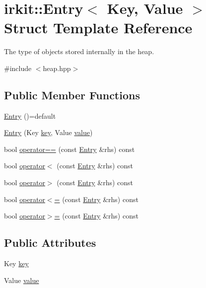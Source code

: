 \hypertarget{structirkit_1_1Entry}{}\section{irkit\+:\+:Entry$<$ Key, Value $>$ Struct Template Reference}
\label{structirkit_1_1Entry}


The type of objects stored internally in the heap.  




{\ttfamily \#include $<$heap.\+hpp$>$}

\subsection*{Public Member Functions}
\begin{DoxyCompactItemize}
\item 
\hyperlink{structirkit_1_1Entry_ab8d6ae4f3f3ff0c1934543f2eca895ea}{Entry} ()=default
\item 
\hyperlink{structirkit_1_1Entry_afe9a7f9975902c4622115176169bc80a}{Entry} (Key \hyperlink{structirkit_1_1Entry_aeae4387483b4905afd7dfd71df9104fc}{key}, Value \hyperlink{structirkit_1_1Entry_a72e5dd8efe13d360f7b97c37d05b99b8}{value})
\item 
bool \hyperlink{structirkit_1_1Entry_aaa12df0ae7e66638a6f0e5ddb552167b}{operator==} (const \hyperlink{structirkit_1_1Entry}{Entry} \&rhs) const
\item 
bool \hyperlink{structirkit_1_1Entry_a4112e1db14a84edfe80b4e75ed8a328c}{operator$<$} (const \hyperlink{structirkit_1_1Entry}{Entry} \&rhs) const
\item 
bool \hyperlink{structirkit_1_1Entry_a0c421723ffe0eb3c56d1efc16f5f2fe5}{operator$>$} (const \hyperlink{structirkit_1_1Entry}{Entry} \&rhs) const
\item 
bool \hyperlink{structirkit_1_1Entry_aa84e1aed3325a2c1bfef85b71a20ed74}{operator$<$=} (const \hyperlink{structirkit_1_1Entry}{Entry} \&rhs) const
\item 
bool \hyperlink{structirkit_1_1Entry_a672de7d54aa88d29475e8664422a8e4f}{operator$>$=} (const \hyperlink{structirkit_1_1Entry}{Entry} \&rhs) const
\end{DoxyCompactItemize}
\subsection*{Public Attributes}
\begin{DoxyCompactItemize}
\item 
Key \hyperlink{structirkit_1_1Entry_aeae4387483b4905afd7dfd71df9104fc}{key}
\item 
Value \hyperlink{structirkit_1_1Entry_a72e5dd8efe13d360f7b97c37d05b99b8}{value}
\end{DoxyCompactItemize}

